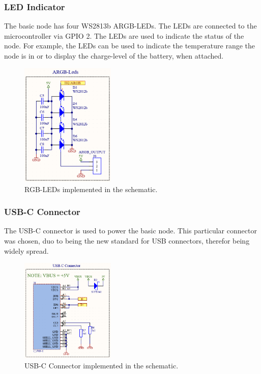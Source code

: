     \subsubsection{LED Indicator}
        The basic node has four WS2813b ARGB-LEDs. The LEDs are connected to the 
        microcontroller via GPIO 2. The LEDs are used to indicate the status of the node. 
        For example, the LEDs can be used to indicate the temperature range the node is in
        or to display the charge-level of the battery, when attached.

        \begin{figure}[H]
            \centering
            \includegraphics[width=0.4\textwidth]{assets/HW/RGB-LED-schematic.png}
            \caption{RGB-LEDs implemented in the schematic.}
        \end{figure}

    \subsubsection{USB-C Connector}

    The USB-C connector is used to power the basic node. This particular connector was
    chosen, duo to being the new standard for USB connectors, therefor being widely spread.
    
    \begin{figure}[H]
        \centering
        \includegraphics[width=0.4\textwidth]{assets/HW/USB-C-schematic.png}
        \caption{USB-C Connector implemented in the schematic.}
    \end{figure}


